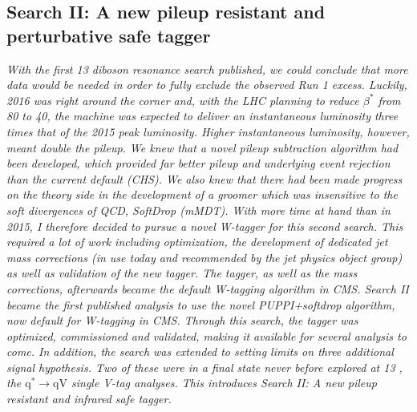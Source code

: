 \vspace*{\fill}
\begin{centering}
\section*{Search II: A new pileup resistant and perturbative safe tagger}
\label{searchII}
\textit{
With the first 13 \TeV diboson resonance search published, we could conclude that more data would be needed in order to fully exclude the observed Run 1 excess. Luckily, 2016 was right around the corner and, with the LHC planning to reduce $\beta^*$ from 80 \cm to 40, the machine was expected to deliver an instantaneous luminosity three times that of the 2015 peak luminosity. Higher instantaneous luminosity, however, meant double the pileup.
\newline
\newline
We knew that a novel pileup subtraction algorithm had been developed, which provided far better pileup and underlying event rejection than the current default (CHS). We also knew that there had been made progress on the theory side in the development of a groomer which was insensitive to the soft divergences of QCD, SoftDrop (mMDT). With more time at hand than in 2015, I therefore decided to pursue a novel W-tagger for this second search. This required a lot of work including optimization, the development of dedicated jet mass corrections (in use today and recommended by the jet physics object group) as well as validation of the new tagger. The tagger, as well as the mass corrections, afterwards became the default W-tagging algorithm in CMS.
\newline
\newline
Search II became the first published analysis to use the novel PUPPI+softdrop algorithm, now default for W-tagging in CMS. Through this search, the tagger was optimized, commissioned and validated, making it available for several analysis to come. In addition, the search was extended to setting limits on three additional signal hypothesis. Two of these were in a final state never before explored at 13 \TeV, the $\textrm{q}^* \rightarrow \textrm{qV}$ single V-tag analyses. This introduces Search II: A new pileup resistant and infrared safe tagger.
}
\end{centering}
